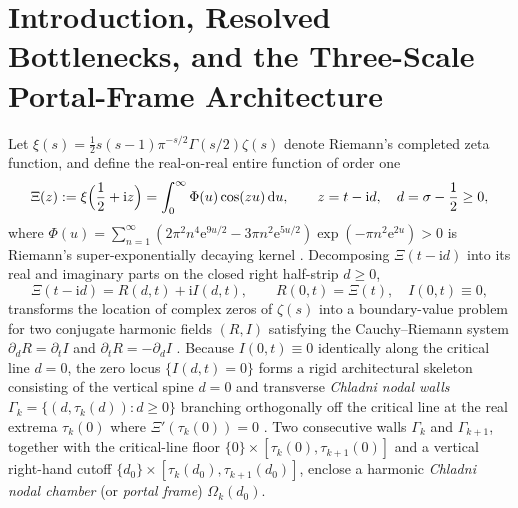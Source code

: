 \documentclass[11pt,reqno]{amsart}
\theoremstyle{definition}
\theoremstyle{remark}
\numberwithin{equation}{section}
\newcommand{\dd}{\mathrm{d}}
\newcommand{\ii}{\mathrm{i}}
\newcommand{\ee}{\mathrm{e}}
\begin{document}
\maketitle

\section{Introduction, Resolved Bottlenecks, and the Three-Scale Portal-Frame Architecture}\label{sec:intro}

Let $\xi(s) = \frac{1}{2}s(s-1)\pi^{-s/2}\Gamma(s/2)\zeta(s)$ denote Riemann's completed zeta function, and define the real-on-real entire function of order one
\begin{equation}\label{eq:Xi-def}
\Xi(z) := \xi\Bigl(\frac{1}{2} + \ii z\Bigr) = \int_0^\infty \Phi(u)\cos(zu)\,\dd u, \qquad z = t - \ii d, \quad d = \sigma - \frac{1}{2} \ge 0,
\end{equation}
where $\Phi(u) = \sum_{n=1}^\infty (2\pi^2 n^4 \ee^{9u/2} - 3\pi n^2 \ee^{5u/2})\exp(-\pi n^2 \ee^{2u}) > 0$ is Riemann's super-exponentially decaying kernel \cite{Riemann1859,Titchmarsh1986}. Decomposing $\Xi(t-\ii d)$ into its real and imaginary parts on the closed right half-strip $d \ge 0$,
\begin{equation}\label{eq:R-I-def}
\Xi(t - \ii d) = R(d,t) + \ii I(d,t), \qquad R(0,t) = \Xi(t), \quad I(0,t) \equiv 0,
\end{equation}
transforms the location of complex zeros of $\zeta(s)$ into a boundary-value problem for two conjugate harmonic fields $(R,I)$ satisfying the Cauchy--Riemann system $\partial_d R = \partial_t I$ and $\partial_t R = -\partial_d I$ \cite{Jensen1913,Polya1926,Speiser1934}. Because $I(0,t) \equiv 0$ identically along the critical line $d=0$, the zero locus $\{I(d,t)=0\}$ forms a rigid architectural skeleton consisting of the vertical spine $d=0$ and transverse \emph{Chladni nodal walls} $\Gamma_k = \{(d,\tau_k(d)) : d \ge 0\}$ branching orthogonally off the critical line at the real extrema $\tau_k(0)$ where $\Xi'(\tau_k(0))=0$ \cite{Missiaen2026P2,Missiaen2026P8,Missiaen2026P13}. Two consecutive walls $\Gamma_k$ and $\Gamma_{k+1}$, together with the critical-line floor $\{0\} \times [\tau_k(0),\tau_{k+1}(0)]$ and a vertical right-hand cutoff $\{d_0\} \times [\tau_k(d_0),\tau_{k+1}(d_0)]$, enclose a harmonic \emph{Chladni nodal chamber} (or \emph{portal frame}) $\Omega_k(d_0)$.
\end{document}

